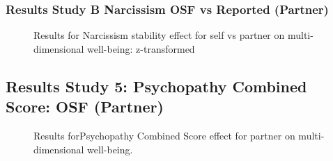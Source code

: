 \documentclass[
  singlecolumn]{article}
\begin{document}
\newpage{}

\subsubsection{Results Study B Narcissism OSF vs Reported
(Partner)}\label{results-study-b-narcissism-osf-vs-reported-partner}

\begin{figure}


\caption{\label{fig-results-narcissism-self-osf}Results for Narcissism
stability effect for self vs partner on multi-dimensional well-being:
z-transformed}

\end{figure}%

\subsection{Results Study 5: Psychopathy Combined Score: OSF
(Partner)}\label{results-study-5-psychopathy-combined-score-osf-partner}

\begin{figure}


\caption{\label{fig-results-psychopathy-partner-osf}Results
forPsychopathy Combined Score effect for partner on multi-dimensional
well-being.}

\end{figure}%

\newpage{}
\end{document}
